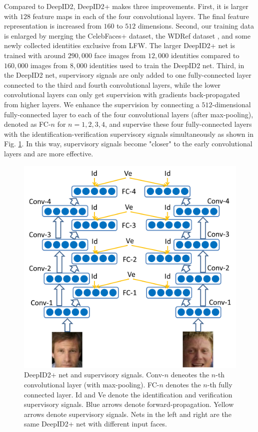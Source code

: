 \documentclass[10pt,twocolumn,letterpaper]{article}
\begin{document}
Compared to DeepID2, DeepID2+ makes three improvements. First, it is larger with $128$ feature maps in each of the four convolutional layers. The final feature representation is increased from $160$ to $512$ dimensions. Second, our training data is  enlarged by merging the CelebFaces+ dataset\cite{sun2014a}, the WDRef dataset \cite{chen2012}, and some newly collected identities exclusive from LFW. The larger DeepID2+ net is trained with around $290,000$ face images from $12,000$ identities compared to $160,000$ images from $8,000$ identities used to train the DeepID2 net. Third, in the DeepID2 net, supervisory signals are only added to one fully-connected layer connected to the third and fourth convolutional layers, while the lower convolutional layers can only get supervision with gradients back-propagated from higher layers. We enhance the supervision by connecting a $512$-dimensional fully-connected layer to each of the four convolutional layers (after max-pooling), denoted as FC-$n$ for $n=1,2,3,4$, and supervise these four fully-connected layers with the identification-verification supervisory signals \cite{sun2014b} simultaneously as shown in Fig. \ref{fig:cnn}. In this way, supervisory signals become "closer" to the early convolutional layers and are more effective.

\begin{figure}[t]
\begin{center}
\includegraphics[width=0.8\linewidth]{picture/23.png}
\end{center}
\vspace{-0.15in}
\caption{DeepID2+ net and  supervisory signals. Conv-$n$ deneotes the $n$-th convolutional layer (with max-pooling). FC-$n$ denotes the $n$-th fully connected layer. Id and Ve denote the identification and verification supervisory signals. Blue arrows denote forward-propagation. Yellow arrows denote supervisory signals. Nets in the left and right are the same DeepID2+ net with different input faces.}
\label{fig:cnn}
\vspace{-0.1in}
\end{figure}
\end{document}
